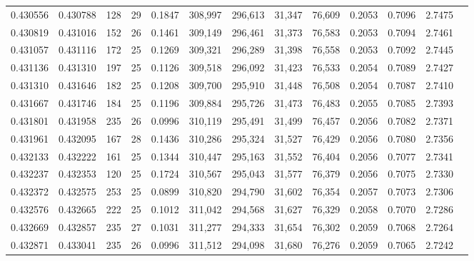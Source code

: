 \begin{tabular}{rrrrrrrrrrrrr}
0.430556 & 0.430788 &    128 &    29 &                                     0.1847 & 308,997 & 296,613 &  31,347 &  76,609 & 0.2053 & 0.7096 & 2.7475 \\
0.430819 & 0.431016 &    152 &    26 &                                     0.1461 & 309,149 & 296,461 &  31,373 &  76,583 & 0.2053 & 0.7094 & 2.7461 \\
0.431057 & 0.431116 &    172 &    25 &                                     0.1269 & 309,321 & 296,289 &  31,398 &  76,558 & 0.2053 & 0.7092 & 2.7445 \\
0.431136 & 0.431310 &    197 &    25 &                                     0.1126 & 309,518 & 296,092 &  31,423 &  76,533 & 0.2054 & 0.7089 & 2.7427 \\
0.431310 & 0.431646 &    182 &    25 &                                     0.1208 & 309,700 & 295,910 &  31,448 &  76,508 & 0.2054 & 0.7087 & 2.7410 \\
0.431667 & 0.431746 &    184 &    25 &                                     0.1196 & 309,884 & 295,726 &  31,473 &  76,483 & 0.2055 & 0.7085 & 2.7393 \\
0.431801 & 0.431958 &    235 &    26 &                                     0.0996 & 310,119 & 295,491 &  31,499 &  76,457 & 0.2056 & 0.7082 & 2.7371 \\
0.431961 & 0.432095 &    167 &    28 &                                     0.1436 & 310,286 & 295,324 &  31,527 &  76,429 & 0.2056 & 0.7080 & 2.7356 \\
0.432133 & 0.432222 &    161 &    25 &                                     0.1344 & 310,447 & 295,163 &  31,552 &  76,404 & 0.2056 & 0.7077 & 2.7341 \\
0.432237 & 0.432353 &    120 &    25 &                                     0.1724 & 310,567 & 295,043 &  31,577 &  76,379 & 0.2056 & 0.7075 & 2.7330 \\
0.432372 & 0.432575 &    253 &    25 &                                     0.0899 & 310,820 & 294,790 &  31,602 &  76,354 & 0.2057 & 0.7073 & 2.7306 \\
0.432576 & 0.432665 &    222 &    25 &                                     0.1012 & 311,042 & 294,568 &  31,627 &  76,329 & 0.2058 & 0.7070 & 2.7286 \\
0.432669 & 0.432857 &    235 &    27 &                                     0.1031 & 311,277 & 294,333 &  31,654 &  76,302 & 0.2059 & 0.7068 & 2.7264 \\
0.432871 & 0.433041 &    235 &    26 &                                     0.0996 & 311,512 & 294,098 &  31,680 &  76,276 & 0.2059 & 0.7065 & 2.7242 \\

\end{tabular}
